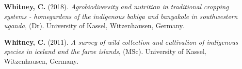 \documentclass[11pt,a4paper,]{awesome-cv}
\newlength{\cslhangindent}
\newenvironment{CSLReferences}[2] %
 {\begin{list}{}{%
  \setlength{\itemindent}{0pt}
  \setlength{\leftmargin}{0pt}
  \setlength{\parsep}{0pt}
  \ifodd #1
   \setlength{\leftmargin}{\cslhangindent}
   \setlength{\itemindent}{-1\cslhangindent}
  \fi
  \setlength{\itemsep}{#2\baselineskip}}}
 {\end{list}}
\begin{document}
\label{refs-6eb24962443e4b6bcc155a0a9900467d}
\begin{CSLReferences}{1}{0}
\textbf{Whitney, C.} (2018). \emph{Agrobiodiversity and nutrition in
traditional cropping systems - homegardens of the indigenous bakiga and
banyakole in southwestern uganda}, (Dr). University of Kassel,
Witzenhausen, Germany.

\textbf{Whitney, C.} (2011). \emph{A survey of wild collection and
cultivation of indigenous species in iceland and the faroe islands},
(MSc). University of Kassel, Witzenhausen, Germany.

\end{CSLReferences}
\end{document}

